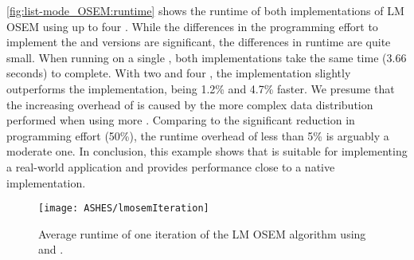 \autoref{fig:list-mode_OSEM:runtime} shows the runtime of both implementations of LM OSEM using up to four \GPUs.
While the differences in the programming effort to implement the \SkelCL and \OpenCL versions are significant, the differences in runtime are quite small.
When running on a single \GPU, both implementations take the same time (3.66 seconds) to complete.
With two and four \GPUs, the \OpenCL implementation slightly outperforms the \SkelCL implementation, being 1.2\% and 4.7\% faster.
We presume that the increasing overhead of \SkelCL is caused by the more complex data distribution performed when using more \GPUs.
Comparing to the significant reduction in programming effort (50\%), the runtime overhead of less than 5\% is arguably a moderate one.
In conclusion, this example shows that \SkelCL is suitable for implementing a real-world application and provides performance close to a native \OpenCL implementation.

\begin{figure}
  \centering
  \texttt{[image: ASHES/lmosemIteration]}
  \caption[Average runtime of one iteration of the LM OSEM algorithm.]%
          {Average runtime of one iteration of the LM OSEM algorithm using \SkelCL and \OpenCL.}
  \label{fig:list-mode_OSEM:runtime}
\end{figure}



